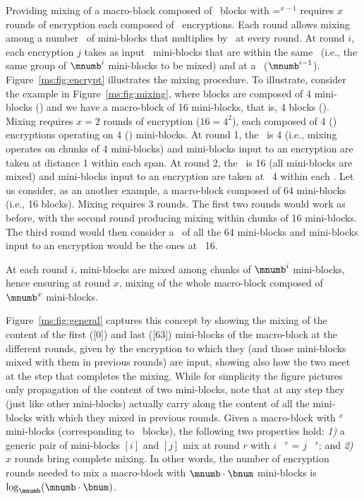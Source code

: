 Providing mixing of a macro-block composed of \bnum\ blocks with \bnum=\mnumb$^{x-1}$ requires $x$ rounds of encryption each composed of \bnum\ encryptions. Each round allows mixing among a number \spanna\ of mini-blocks that multiplies by \mnumb\ at every round. At round $i$, each encryption $j$ takes as input \mnumb\ mini-blocks that are within the same \spanna\ (i.e., the same group of $\mnumb^i$ mini-blocks to be mixed) and at a \distance\ ($\mnumb^{i-1}$). Figure~\ref{ms:fig:encrypt} illustrates the mixing procedure. To illustrate, consider the example in Figure~\ref{ms:fig:mixing}, where blocks are composed of 4 mini-blocks () and we have a macro-block of 16 mini-blocks, that is, 4 blocks (). Mixing requires $x=2$ rounds of encryption ($16=4^2$), each composed of 4 (\bnum) encryptions operating on 4 (\mnumb) mini-blocks. At round 1, the \spanna\ is 4 (i.e., mixing operates on chunks of 4 mini-blocks) and mini-blocks input to an encryption are taken at distance 1 within each span. At round 2, the \spanna\ is 16 (all mini-blocks are mixed) and mini-blocks input to an encryption are taken at \distance\ 4 within each \spanna. Let us consider, as an another example, a macro-block composed of 64 mini-blocks (i.e., 16 blocks). Mixing requires 3 rounds. The first two rounds would work as before, with the second round producing mixing within chunks of 16 mini-blocks. The third round would then consider a \spanna\ of all the 64 mini-blocks and mini-blocks input to an encryption would be the ones at \distance\ 16.

At each round $i$, mini-blocks are mixed among chunks of $\mnumb^i$ mini-blocks, hence ensuring at round $x$, mixing of the whole macro-block composed of $\mnumb^x$ mini-blocks.

Figure~\ref{ms:fig:general} captures this concept by showing the mixing of the content of the first ([0]) and last ([63]) mini-blocks of the macro-block at the different rounds, given by the encryption to which they (and those mini-blocks mixed with them in previous rounds) are input, showing also how the two meet at the step that completes the mixing. While for simplicity the figure pictures only propagation of the content of two mini-blocks, note that at any step they (just like other mini-blocks) actually carry along the content of all the mini-blocks with which they mixed in previous rounds. Given a macro-block \macroblock{} with \mnumb$^x$ mini-blocks (corresponding to \bnum\ blocks), the following two properties hold: {\em 1)\/} a generic pair of mini-blocks $[i]$ and $[j]$ mix at round $r$ with $i$ \mydiv\ \mnumb$^r$ = $j$ \mydiv\ \mnumb$^r$; and {\em 2)\/} $x$ rounds bring complete mixing. In other words, the number of encryption rounds needed to mix a macro-block with $\mnumb \cdot \bnum$ mini-blocks is $\log_{\mnumb}(\mnumb\cdot\bnum)$.

